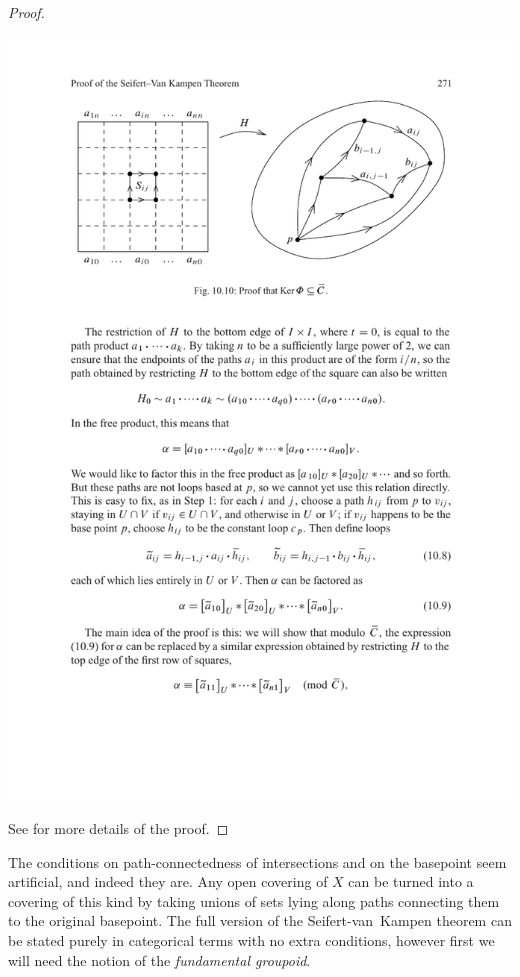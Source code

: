 \begin{proof}
    \begin{center}
        \includegraphics[scale=1]{figures/kernel of Phi.pdf}
    \end{center}
    
    See \cite[Thm.~1.20]{Hatcher} for more details of the proof.
\end{proof}

The conditions on path-connectedness of intersections and on the basepoint seem artificial, and indeed they are. Any open covering of $X$ can be turned into a covering of this kind by taking unions of sets lying along paths connecting them to the original basepoint. The full version of the Seifert-van~Kampen theorem can be stated purely in categorical terms with no extra conditions, however first we will need the notion of the \emph{fundamental groupoid}.

